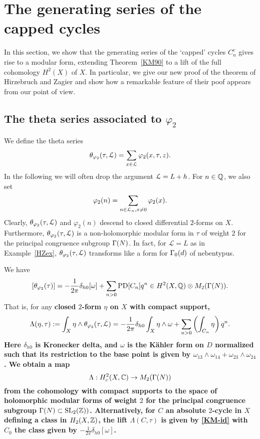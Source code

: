 \section{The generating series of the capped cycles}

In this section, we show that the generating series of the `capped'
cycles $C_n^c$ gives rise to a modular form, extending Theorem~\ref{KM90}
to a lift of the full cohomology $H^2(X)$ of $X$. In particular,
we give our new proof of the theorem of Hirzebruch and Zagier and
show how a remarkable feature of their poof appears from our point
of view.


\subsection{The theta series associated to $\varphi_2$}

We define the theta series
\[
\theta_{\varphi_2}(\tau,\mathcal{L}) = \sum_{x \in \mathcal{L}} \varphi_2(x,\tau,z).
\]
 In the following we will often drop the argument $\mathcal{L} = L+h$. For $n \in \mathbb{Q}$, we also set 
\[
\varphi_2(n) = \sum_{n \in \mathcal{L}_n, x \ne0} \varphi_2(x).
\]
Clearly, $\theta_{\varphi_2}(\tau,\mathcal{L})$ and $\varphi_2(n)$ descend
to closed differential $2$-forms on $X$. Furthermore,
$\theta_{\varphi_2}(\tau,\mathcal{L})$ is a non-holomorphic modular form
in $\tau$ of weight $2$ for the principal congruence subgroup
$\Gamma(N)$. In fact, for $\mathcal{L} = L$ as in Example~\ref{HZex},
$\theta_{\varphi_2}(\tau,\mathcal{L})$ transforms like a form for $\Gamma_0(d)$
of nebentypus.

\begin{theorem}\label{KM90}
We have
\[
[\theta_{\varphi_2}(\tau)] =  -\frac{1}{2\pi}\delta_{h0} [\omega] + \sum_{n>0} \operatorname{PD}[C_n] q^n \in H^2(X,\mathbb{Q}) \otimes M_2(\Gamma(N)).
\]
That is, for any \bf{closed} $2$-form $\eta$ on $X$ with compact support,
\[
\Lambda(\eta,\tau) := \int_X \eta \wedge \theta_{\varphi_2}(\tau,\mathcal{L})= -\frac{1}{2\pi}\delta_{h0} \int_X \eta \wedge \omega + \sum_{n>0} \left( \int_{C_n} \eta \right)q^n.
\]
Here $\delta_{h0}$ is Kronecker delta, and $\omega$ is the K{\"a}hler
form on $D$ normalized such that its restriction to the base point
is given by $\omega_{13}\wedge \omega_{14}+\omega_{23}\wedge
\omega_{24}$.
We obtain a map
\begin{equation}
\Lambda: H_c^{2}(X,\mathbb{C}) \to M_{2}(\Gamma(N))
\end{equation}
from the cohomology with compact supports to the space of holomorphic
modular forms of weight $2$ for the principal congruence subgroup
$\Gamma(N) \subset \operatorname{SL}_2(\mathbb{Z}))$. Alternatively, for $C$ an absolute
$2$-cycle in $X$ defining a class in $H_2(X,\mathbb{Z})$, the lift
$\Lambda(C,\tau)$ is given by \eqref{KM-id} with $C_0$ the class
given by $-\frac{1}{2\pi}\delta_{h0} [\omega]$.
\end{theorem}


